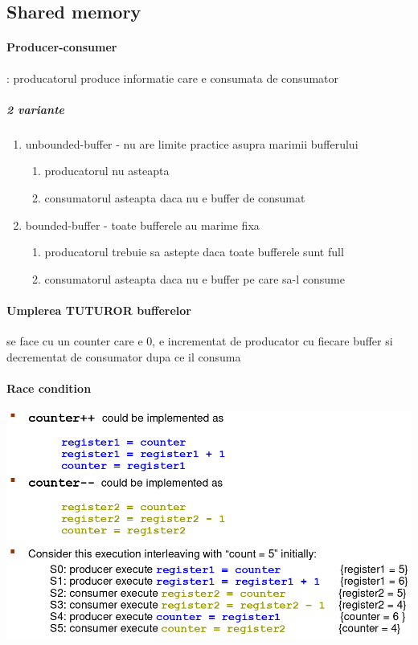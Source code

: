 \documentclass{article}
\begin{document}
\subsection*{Shared memory}

\paragraph*{Producer-consumer}: producatorul produce informatie care e consumata de consumator
\subparagraph*{2 variante}
\begin{enumerate}
    \item unbounded-buffer - nu are limite practice asupra marimii bufferului
          \begin{enumerate}
              \item producatorul nu asteapta
              \item consumatorul asteapta daca nu e buffer de consumat
          \end{enumerate}
    \item bounded-buffer - toate bufferele au marime fixa
          \begin{enumerate}
              \item producatorul trebuie sa astepte daca toate bufferele sunt full
              \item consumatorul asteapta daca nu e buffer pe care sa-l consume
          \end{enumerate}
\end{enumerate}

\paragraph*{Umplerea TUTUROR bufferelor} se face cu un counter care e 0, e incrementat de producator cu fiecare buffer si decrementat de consumator dupa ce il consuma

\paragraph*{Race condition}

\begin{center}
    \includegraphics[scale=0.3]{6_racecondition.png}
\end{center}
\end{document}
